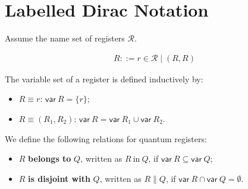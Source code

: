 

\newcommand{\fst}{\mathsf{fst}\ }
\newcommand{\snd}{\mathsf{snd}\ }
\newcommand{\var}{\mathsf{var}\ }
\newcommand{\Var}{\mathsf{Var}\ }
\newcommand{\reg}{\mathsf{Reg}\ }
\newcommand{\DType}{\mathcal{D}}
\newcommand{\cR}{\mathcal{R}}
\newcommand{\cN}{\mathcal{N}}
\newcommand{\tD}{\tilde{D}}
\newcommand{\te}{\tilde{e}}
\newcommand{\tT}{\tilde{T}}
\newcommand{\tADD}{\widetilde{ADD}}
\newcommand{\bU}{\mathbf{U}}
\newcommand{\<}{\langle}
\newcommand{\simp}{\mathsf{Simp}}
\newcommand{\List}{\mathsf{list}}
\renewcommand{\>}{\rangle}


\section{Labelled Dirac Notation}



Assume the name set of registers $\cR$.
\begin{definition}
  \begin{align*}
    R ::= r\in\cR \mid (R, R)
  \end{align*}
\end{definition}

\begin{definition}
The variable set of a register is defined inductively by:
\begin{itemize}
    \item $R\equiv r$: $\var R = \{r\}$;
    \item $R\equiv (R_1,R_2)$: $\var R = \var R_1 \cup\var R_2$.
\end{itemize}  
We define the following relations for quantum registers:
\begin{itemize}
  \item $R$ \textbf{belongs to} $Q$, written as $R\ \text{in}\ Q$, if $\var R\subseteq \var Q$;
  \item $R$ \textbf{is disjoint with} $Q$, written as $R \| Q$, if $\var R \cap \var Q = \emptyset$.
\end{itemize}
\end{definition}


